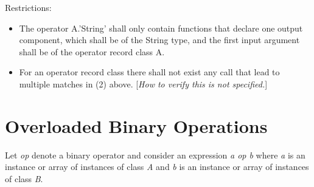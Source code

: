 \documentclass[10pt,a4paper]{report}
\def\doublelabel#1{\label{#1}}
\begin{document}
Restrictions:

\begin{itemize}
\item
  The operator A.'String' shall only contain functions that declare one
  output component, which shall be of the String type, and the first
  input argument shall be of the operator record class A.
\item
  For an operator record class there shall not exist any call that lead
  to multiple matches in (2) above. {[}\emph{How to verify this is not
  specified.}{]}
\end{itemize}

\section{Overloaded Binary Operations}\doublelabel{overloaded-binary-operations}

Let \emph{op} denote a binary operator and consider an expression
\emph{a op b} where \emph{a} is an instance or array of instances of
class \emph{A} and \emph{b} is an instance or array of instances of
class \emph{B}.
\end{document}

